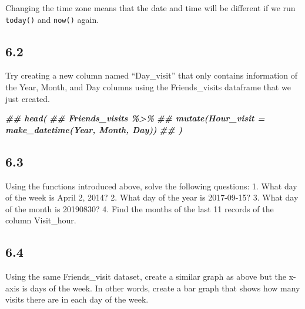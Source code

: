 \documentclass[
]{book}
\newenvironment{Shaded}{\begin{snugshade}}{\end{snugshade}}
\newcommand{\CommentTok}[1]{\textcolor[rgb]{0.56,0.35,0.01}{\textit{#1}}}
\newcommand{\DocumentationTok}[1]{\textcolor[rgb]{0.56,0.35,0.01}{\textbf{\textit{#1}}}}
\begin{document}
Changing the time zone means that the date and time will be different if we run \texttt{today()} and \texttt{now()} again.

\hypertarget{section-33}{%
\subsection{6.2}\label{section-33}}

Try creating a new column named ``Day\_visit'' that only contains information of the Year, Month, and Day columns using the Friends\_visits dataframe that we just created.

\begin{Shaded}
\begin{Highlighting}[]
\DocumentationTok{\#\# head(}
\DocumentationTok{\#\#   Friends\_visits \%\textgreater{}\% }
\DocumentationTok{\#\#   mutate(Hour\_visit = make\_datetime(Year, Month, Day))}
\DocumentationTok{\#\#    )}
\end{Highlighting}
\end{Shaded}

\hypertarget{section-34}{%
\subsection{6.3}\label{section-34}}

Using the functions introduced above, solve the following questions:
1. What day of the week is April 2, 2014?
2. What day of the year is 2017-09-15?
3. What day of the month is 20190830?
4. Find the months of the last 11 records of the column Visit\_hour.

\begin{Shaded}
\end{Shaded}

\hypertarget{section-35}{%
\subsection{6.4}\label{section-35}}

Using the same Friends\_visit dataset, create a similar graph as above but the x-axis is days of the week. In other words, create a bar graph that shows how many visits there are in each day of the week.
\end{document}
